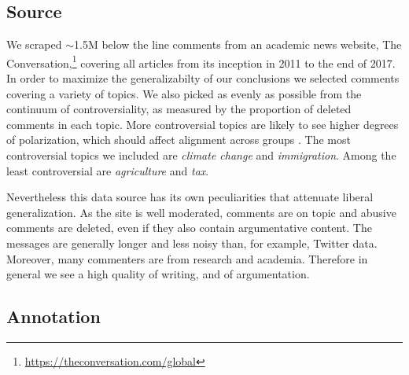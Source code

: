 \documentclass[11pt,a4paper]{article}
\begin{document}
\subsection{Source}

We scraped $\sim$1.5M below the line comments from an academic news website, The Conversation,\footnote{\hyperlink{https://theconversation.com/global}{https://theconversation.com/global}} covering all articles from its inception in 2011 to the end of 2017. In order to maximize the generalizabilty of our conclusions we selected comments covering a variety of topics. We also picked as evenly as possible from the continuum of controversiality, as measured by the proportion of deleted comments in each topic. More controversial topics are likely to see higher degrees of polarization, which should affect alignment across groups \cite{ShinD18}. The most controversial topics we included are \textit{climate change} and \textit{immigration}. Among the least controversial are \textit{agriculture} and \textit{tax}.

Nevertheless this data source has its own peculiarities that attenuate liberal generalization. As the site is well moderated, comments are on topic and abusive comments are deleted, even if they also contain argumentative content. The messages are generally longer and less noisy than, for example, Twitter data. Moreover, many commenters are from research and academia. Therefore in general we see a high quality of writing, and of argumentation.



\subsection{Annotation}
\end{document}
